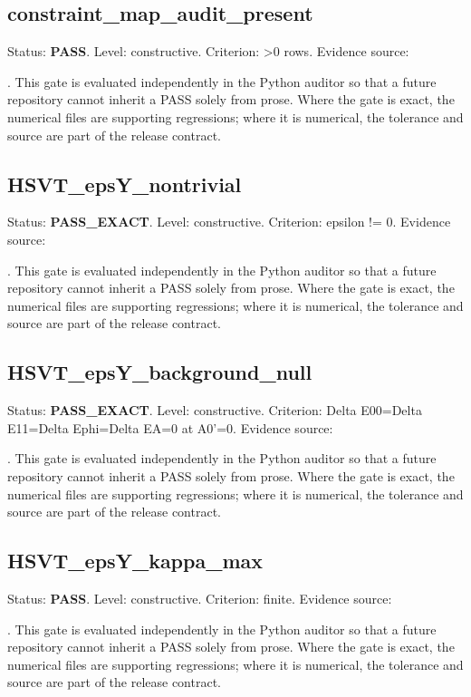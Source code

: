 \documentclass[11pt,a4paper,oneside]{book}
\begin{document}
\subsection{constraint\_map\_audit\_present}
Status: \textbf{PASS}. Level: constructive. Criterion: >0 rows. Evidence source:\par\noindent{}. This gate is evaluated independently in the Python auditor so that a future repository cannot inherit a PASS solely from prose. Where the gate is exact, the numerical files are supporting regressions; where it is numerical, the tolerance and source are part of the release contract.\par

\subsection{HSVT\_epsY\_nontrivial}
Status: \textbf{PASS\_EXACT}. Level: constructive. Criterion: epsilon != 0. Evidence source:\par\noindent{}. This gate is evaluated independently in the Python auditor so that a future repository cannot inherit a PASS solely from prose. Where the gate is exact, the numerical files are supporting regressions; where it is numerical, the tolerance and source are part of the release contract.\par

\subsection{HSVT\_epsY\_background\_null}
Status: \textbf{PASS\_EXACT}. Level: constructive. Criterion: Delta E00=Delta E11=Delta Ephi=Delta EA=0 at A0'=0. Evidence source:\par\noindent{}. This gate is evaluated independently in the Python auditor so that a future repository cannot inherit a PASS solely from prose. Where the gate is exact, the numerical files are supporting regressions; where it is numerical, the tolerance and source are part of the release contract.\par

\subsection{HSVT\_epsY\_kappa\_max}
Status: \textbf{PASS}. Level: constructive. Criterion: finite. Evidence source:\par\noindent{}. This gate is evaluated independently in the Python auditor so that a future repository cannot inherit a PASS solely from prose. Where the gate is exact, the numerical files are supporting regressions; where it is numerical, the tolerance and source are part of the release contract.\par
\end{document}
